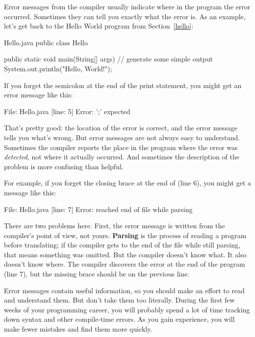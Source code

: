 
Error messages from the compiler usually indicate where in the program the error occurred.
Sometimes they can tell you exactly what the error is.
As an example, let's get back to the Hello World program from Section~\ref{hello}:

\begin{trinket}[235]{Hello.java}
public class Hello {

    public static void main(String[] args) {
        // generate some simple output
        System.out.println("Hello, World!");
    }
}
\end{trinket}


If you forget the semicolon at the end of the print statement, you might get an error message like this:

\begin{stdout}
File: Hello.java  [line: 5]
Error: ';' expected
\end{stdout}

That's pretty good: the location of the error is correct, and the error message tells you what's wrong.
But error messages are not always easy to understand.
Sometimes the compiler reports the place in the program where the error was {\em detected}, not where it actually occurred.
And sometimes the description of the problem is more confusing than helpful.

For example, if you forget the closing brace at the end of  (line 6), you might get a message like this:

\begin{stdout}
File: Hello.java  [line: 7]
Error: reached end of file while parsing
\end{stdout}


There are two problems here.
First, the error message is written from the compiler's point of view, not yours.
{\bf Parsing} is the process of reading a program before translating; if the compiler gets to the end of the file while still parsing, that means something was omitted.
But the compiler doesn't know what.
It also doesn't know where.
The compiler discovers the error at the end of the program (line 7), but the missing brace should be on the previous line.

Error messages contain useful information, so you should make an effort to read and understand them.
But don't take them too literally.
During the first few weeks of your programming career, you will probably spend a lot of time tracking down syntax and other compile-time errors.
As you gain experience, you will make fewer mistakes and find them more quickly.


